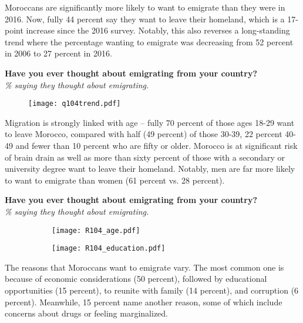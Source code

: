 \documentclass[12pt]{article}
\begin{document}
	\noindent Moroccans are significantly more likely to want to emigrate than they were in 2016. Now, fully 44 percent say they want to leave their homeland, which is a 17-point increase since the 2016 survey. Notably, this also reverses a long-standing trend where the percentage wanting to emigrate was decreasing from 52 percent in 2006 to 27 percent in 2016.
	
		\begin{center}
		{\textbf{Have you ever thought about emigrating from your country?}}\\
		\emph{\% saying they thought about emigrating.}
		\begin{figure}[H]
			\centering
			\texttt{[image: q104trend.pdf]}
		\end{figure}
	\end{center}
	
	\noindent Migration is strongly linked with age -- fully 70 percent of those ages 18-29 want to leave Morocco, compared with half (49 percent) of those 30-39, 22 percent 40-49 and fewer than 10 percent who are fifty or older. Morocco is at significant risk of brain drain as well as more than sixty percent of those with a secondary or university degree want to leave their homeland. Notably, men are far more likely to want to emigrate than women (61 percent vs. 28 percent).
	
	\pagebreak
	\begin{center}
		{\textbf{Have you ever thought about emigrating from your country?}}\\
		\emph{\% saying they thought about emigrating.}
	\end{center}
	\begin{figure}[H]
		\hspace{-1cm}\begin{minipage}{0.5\linewidth}
			\begin{figure}[H]
				\centering
				\texttt{[image: R104\_age.pdf]} 
			\end{figure}
		\end{minipage}
		\begin{minipage}{0.4\linewidth}
			\begin{figure}[H]
				\texttt{[image: R104\_education.pdf]}
			\end{figure}
		\end{minipage}
	\end{figure}
	
	\noindent The reasons that Moroccans want to emigrate vary. The most common one is because of economic considerations (50 percent), followed by educational opportunities (15 percent), to reunite with family (14 percent), and corruption (6 percent). Meanwhile, 15 percent name another reason, some of which include concerns about drugs or feeling marginalized.
	
\end{document}
